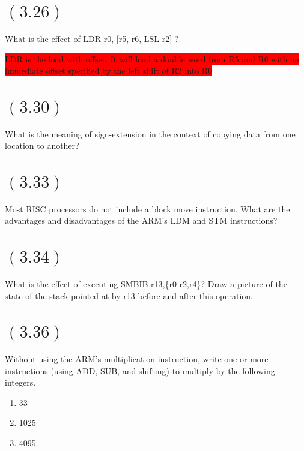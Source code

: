 \documentclass[letterpaper,12pt,titlepage]{article}
\begin{document}
\section*{$(3.26)$} What is the effect of LDR r0, [r5, r6, LSL r2] ?

\begin{mdframed}[style=MyFrame]
\colorbox{red}{LDR is the load with offset. It will load a double word from R5 and R6 with an }\\\colorbox{red} {immediate offset specified by the left shift of R2 into R0}
\end{mdframed}

\section*{$(3.30)$} What is the meaning of sign-extension in the context of copying data from one location to another?

\begin{mdframed}[style=MyFrame]
\end{mdframed}

\section*{$(3.33)$} Most RISC processors do not include a block move instruction. What are the advantages and disadvantages of the ARM's LDM and STM instructions?

\begin{mdframed}[style=MyFrame]
\end{mdframed}

\section*{$(3.34)$} What is the effect of executing SMBIB r13,\{r0-r2,r4\}? Draw a picture of the state of the stack pointed at by r13 before and after this operation.

\begin{mdframed}[style=MyFrame]
\end{mdframed}

\section*{$(3.36)$} Without using the ARM's multiplication instruction, write one or more instructions (using ADD, SUB, and shifting) to multiply by the following integers.

\begin{enumerate}[label=\Alph*]
\item 33
\item 1025
\item 4095
\end{enumerate}
\end{document}
